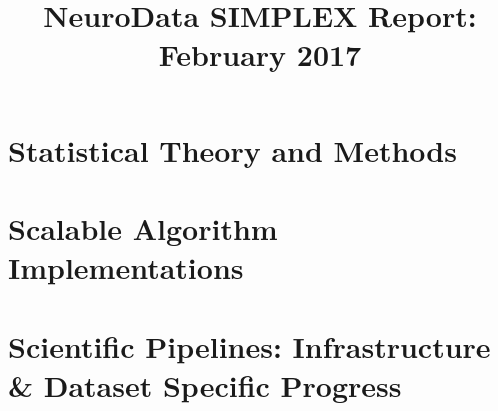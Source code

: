 \documentclass[12pt]{article}
\title{NeuroData SIMPLEX Report: February 2017}
\begin{document}

\newpage




\section{Statistical Theory and Methods}


%





%
%
%


\section{Scalable Algorithm Implementations}

%

%



\section{Scientific Pipelines: Infrastructure \& Dataset Specific
  Progress}


%







\end{document}
